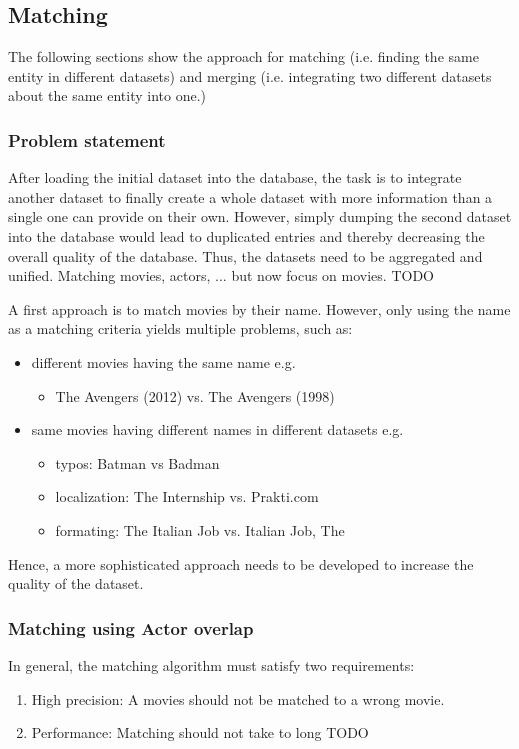 \subsection{Matching}
\label{subsec_method_matching}

The following sections show the approach for matching (i.e. finding the same entity in different datasets) and merging (i.e. integrating two different datasets about the same entity into one.)

\subsubsection{Problem statement}
After loading the initial dataset into the database, the task is to integrate another dataset to finally create a whole dataset with more information than a single one can provide on their own.
However, simply dumping the second dataset into the database would lead to duplicated entries and thereby decreasing the overall quality of the database.
Thus, the datasets need to be aggregated and unified.
Matching movies, actors, ... but now focus on movies. TODO

A first approach is to match movies by their name.
However, only using the name as a matching criteria yields multiple problems, such as:
\begin{itemize}
	\item different movies having the same name e.g.
	\begin{itemize} 
        \item The Avengers (2012) vs. The Avengers (1998)
    \end{itemize}
	\item same movies having different names in different datasets e.g.
	\begin{itemize} 
        \item typos: Batman vs Badman
        \item localization: The Internship vs. Prakti.com
        \item formating: The Italian Job vs. Italian Job, The
     \end{itemize}
\end{itemize}
Hence, a more sophisticated approach needs to be developed to increase the quality of the dataset.

\subsubsection{Matching using Actor overlap}
In general, the matching algorithm must satisfy two requirements:
\begin{enumerate}
	\item{High precision}: A movies should not be matched to a wrong movie.
	\item{Performance:} Matching should not take to long TODO
\end{enumerate}

